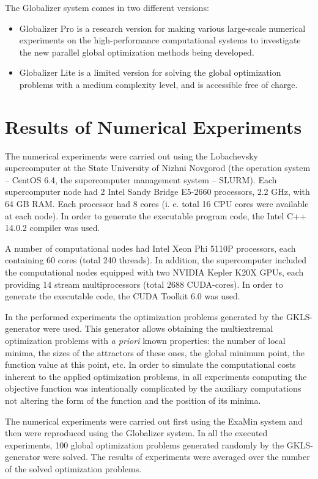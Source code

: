 \documentclass{aims}
\theoremstyle{definition}
\begin{document}
\par
The Globalizer system comes in two different versions:
\begin{itemize}
  \item Globalizer Pro is a research version for making various large-scale numerical experiments on the high-performance computational systems to investigate the new parallel global optimization methods being developed.
  \item Globalizer Lite is a limited version for solving the global optimization problems with a medium complexity level, and is accessible free of charge.
\end{itemize}

\section{Results of Numerical Experiments}
\label{sec:experiments}
The numerical experiments were carried out using the Lobachevsky supercomputer at
the State University of Nizhni Novgorod (the operation system – CentOS 6.4, the
supercomputer management system – SLURM). Each supercomputer node had 2 Intel Sandy Bridge
E5-2660 processors, 2.2 GHz, with 64 GB RAM. Each processor had 8 cores (i. e. total
16 CPU cores were available at each node). In order to generate the executable program code, the Intel C++ 14.0.2 compiler was used.
\par
A number of computational nodes had Intel Xeon Phi 5110P processors, each containing 60 cores
(total 240 threads). In addition, the supercomputer included the computational nodes equipped
with two NVIDIA Kepler K20X GPUs, each providing 14 stream multiprocessors (total 2688 CUDA-cores). In order to generate the executable code, the CUDA Toolkit 6.0 was used.
\par
In the performed experiments the optimization problems generated by the GKLS-generator
\cite{gavianoKvasovLeraSergeev2003} were used. This generator allows obtaining the multiextremal optimization
problems with \textit{a priori} known properties: the number of local minima, the sizes of the attractors of these ones, the global minimum point, the function value at this point, etc. In order to simulate the computational costs inherent to the applied optimization problems, in all experiments computing the objective function was intentionally complicated by the auxiliary computations not altering the form of the function and the position of its minima.
\par
The numerical experiments were carried out first using the ExaMin system and then were reproduced using the Globalizer system. In all the executed experiments, 100 global optimization problems generated randomly by the GKLS-generator were solved. The results of experiments were averaged over the number of the solved optimization problems.
\end{document}
